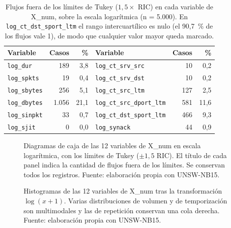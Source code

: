 \begin{table}[htbp]
  \centering
  \caption[Atípicos de Tukey por variable]{Flujos fuera de los límites de Tukey ($1{,}5\times$ RIC) en cada variable de X\_num, sobre la escala logarítmica (n = 5.000). En \texttt{log\_ct\_dst\_sport\_ltm} el rango intercuartílico es nulo (el 90,7~\% de los flujos vale 1), de modo que cualquier valor mayor queda marcado.}\label{tab:a-atipicos}
  \begin{tablacompacta}
  \begin{tabular}{@{}lrr@{\hspace{1cm}}lrr@{}}
  \toprule
  Variable & Casos & \% & Variable & Casos & \% \\
  \midrule
  \texttt{log\_dur} & 189 & 3,8 & \texttt{log\_ct\_srv\_src} & 10 & 0,2 \\
  \texttt{log\_spkts} & 19 & 0,4 & \texttt{log\_ct\_srv\_dst} & 10 & 0,2 \\
  \texttt{log\_sbytes} & 256 & 5,1 & \texttt{log\_ct\_src\_ltm} & 127 & 2,5 \\
  \texttt{log\_dbytes} & 1.056 & 21,1 & \texttt{log\_ct\_src\_dport\_ltm} & 581 & 11,6 \\
  \texttt{log\_sinpkt} & 33 & 0,7 & \texttt{log\_ct\_dst\_sport\_ltm} & 466 & 9,3 \\
  \texttt{log\_sjit} & 0 & 0,0 & \texttt{log\_synack} & 44 & 0,9 \\
  \bottomrule
  \end{tabular}
  \end{tablacompacta}
\end{table}

\begin{figure}[htbp]
  \centering
  \caption[Diagramas de caja de X\_num]{Diagramas de caja de las 12 variables de X\_num en escala logarítmica, con los límites de Tukey ($\pm 1{,}5$ RIC). El título de cada panel indica la cantidad de flujos fuera de los límites. Se conservan todos los registros. Fuente: elaboración propia con UNSW-NB15.}
  \label{fig:a-boxplots}
\end{figure}

\begin{figure}[htbp]
  \centering
  \caption[Histogramas en escala logarítmica]{Histogramas de las 12 variables de X\_num tras la transformación $\log(x+1)$. Varias distribuciones de volumen y de temporización son multimodales y las de repetición conservan una cola derecha. Fuente: elaboración propia con UNSW-NB15.}
  \label{fig:a-hist-log}
\end{figure}


